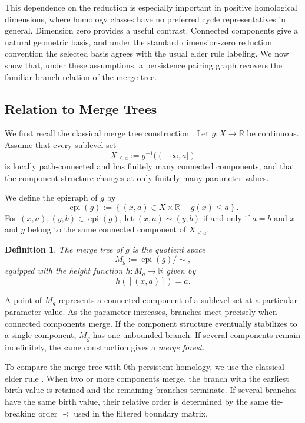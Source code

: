 \documentclass[11pt]{article}
\theoremstyle{paperdefinition}
\newtheorem{definition}{Definition}[section]
\theoremstyle{paperplain}
\theoremstyle{paperremark}
\begin{document}
This dependence on the reduction is especially important in positive homological dimensions, where homology classes have no preferred cycle representatives in general. Dimension zero provides a useful contrast. Connected components give a natural geometric basis, and under the standard dimension-zero reduction convention the selected basis agrees with the usual elder rule labeling. We now show that, under these assumptions, a persistence pairing graph recovers the familiar branch relation of the merge tree.

\subsection{Relation to Merge Trees}
\label{subsec:merge-tree-relation}

We first recall the classical merge tree construction
\cite{morozov2013interleaving}. Let $g:X\longrightarrow\mathbb R$ be continuous. Assume that every sublevel set
\[
X_{\leq a} := g^{-1}((-\infty,a])
\]
is locally path-connected and has finitely many connected components, and that the component structure changes at only finitely many parameter values.

We define the epigraph of $g$ by
\[
\operatorname{epi}(g) := \left\{ (x,a)\in X\times\mathbb R \ \middle|\ g(x)\leq a \right\}.
\]
For $(x,a),(y,b)\in\operatorname{epi}(g)$, let $(x,a)\sim(y,b)$ if and only if $a=b$ and $x$ and $y$ belong to the same connected component of $X_{\leq a}$.

\begin{definition}
\label{def:merge-tree}
The \emph{merge tree} of $g$ is the quotient space
\[
M_g := \operatorname{epi}(g)/{\sim},
\]
equipped with the height function $h:M_g\longrightarrow\mathbb R$ given by
\[
h([(x,a)])=a.
\]
\end{definition}

A point of $M_g$ represents a connected component of a sublevel set at a particular parameter value. As the parameter increases, branches meet precisely when connected components merge. If the component structure eventually stabilizes to a single component, $M_g$ has one unbounded branch. If several components remain indefinitely, the same construction gives a \emph{merge forest}.

To compare the merge tree with $0$th persistent homology, we use the classical elder rule \cite{edelsbrunnerharer2010computational}. When two or more components merge, the branch with the earliest birth value is retained and the remaining branches terminate. If several branches have the same birth value, their relative order is determined by the same tie-breaking order $\prec$ used in the filtered boundary matrix.
\end{document}
